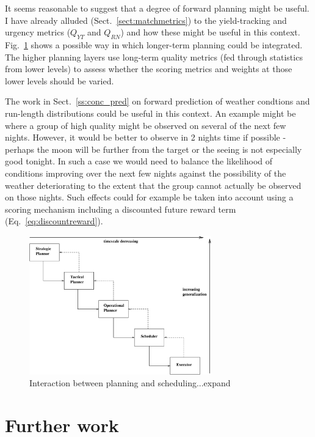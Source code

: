It seems reasonable to suggest that a degree of forward planning might be useful. I have already alluded (Sect.~\ref{sect:matchmetrics}) to the yield-tracking and urgency metrics ($Q_{YT}$ and $Q_{RN}$) and how these might be useful in this context. Fig.~\ref{fig:plan_sched} shows a possible way in which longer-term planning could be integrated. The higher planning layers use long-term quality metrics (fed through statistics from lower levels) to assess whether the scoring metrics and weights at those lower levels should be varied.

 The work in Sect.~\ref{ss:conc_pred} on forward prediction of weather condtions and run-length distributions could be useful in this context. An example might be where a group of high quality might be observed on several of the next few nights. However, it would be better to observe in 2 nights time if possible - perhaps the moon will be further from the target or the seeing is not especially good tonight. In such a case we would need to balance the likelihood of conditions improving over the next few nights against the possibility of the weather deteriorating to the extent that the group cannot actually be observed on those nights. Such effects could for example be taken into account using a scoring mechanism including a discounted future reward term (Eq.~\ref{eq:discountreward}). 

   \begin{figure}[htp]
   \begin{center}
   \includegraphics[height=6cm]{figures/plan_sched.eps}
   \end{center}
   \caption[Interaction between planning and scheduling.] 
   {Interaction between planning and scheduling...expand}
   \label{fig:plan_sched} 
   \end{figure} 

\section{Further work}
\label{sect:further}

